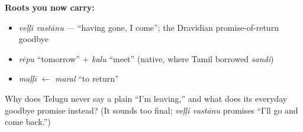 \begin{cousinweb}
\textbf{Roots you now carry:}

\begin{itemize}
\raggedright
  \item \emph{veḷḷi vastānu} — \textquotedblleft{}having gone, I come\textquotedblright{}; the Dravidian promise-of-return goodbye
  \item \emph{rēpu} \textquotedblleft{}tomorrow\textquotedblright{} + \emph{kalu} \textquotedblleft{}meet\textquotedblright{} (native, where Tamil borrowed \emph{sandi})
  \item \emph{maḷḷī} $\leftarrow$ \emph{maral} \textquotedblleft{}to return\textquotedblright{}
\end{itemize}
\end{cousinweb}

\begin{tcolorbox}[breakable,colback=teal!4,colframe=teal!35!black,title={Before you move on}]
Why does Telugu never say a plain \textquotedblleft{}I'm leaving,\textquotedblright{} and what does its everyday goodbye promise instead? (It sounds too final; \emph{veḷḷi vastānu} promises \textquotedblleft{}I'll go and come back.\textquotedblright{})
\end{tcolorbox}
